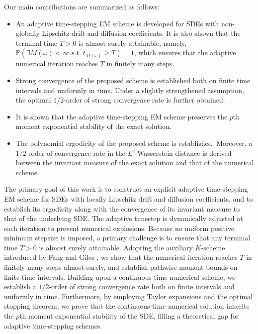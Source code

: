 \documentclass[preprint,12pt,compress]{elsarticle}
\begin{document}
Our main contributions are summarized as follows:
\begin{itemize}
	\item An adaptive time-stepping EM scheme is developed for SDEs with non-globally Lipschitz drift and diffusion coefficients. It is also shown that the terminal time $T>0$ is almost surely attainable, namely,
	$\mathbb{P}(\exists M(\omega ) < \infty \; \text{s.t.} \; {t_{M(\omega )}} \ge T) = 1$,
	which ensures that the adaptive numerical iteration reaches $T$ in finitely many steps.

	\item Strong convergence of the proposed scheme is established both on finite time intervals and uniformly in time. Under a slightly strengthened assumption, the optimal $1/2$-order of strong convergence rate is further obtained.
	
	\item It is shown that the adaptive time-stepping EM scheme preserves the $p$th moment exponential stability of the exact solution.
	
	\item The polynomial ergodicity of the proposed scheme is established. Moreover, a $1/2$-order of convergence rate in the $L^q$-Wasserstein distance is derived between the invariant measure of the exact solution and that of the numerical scheme.

\end{itemize}

The primary goal of this work is to construct an explicit adaptive time-stepping EM scheme for SDEs with locally Lipschitz drift and diffusion coefficients, and to establish its ergodicity along with the convergence of its invariant measure to that of the underlying SDE.
The adaptive timestep is dynamically adjusted at each iteration to prevent numerical explosions.
Because no uniform positive minimum stepsize is imposed, a primary challenge is to ensure that any terminal time $T > 0$ is almost surely attainable. Adopting the auxiliary $K$-scheme introduced by Fang and Giles \cite{fang2020adaptive}, we show that the numerical iteration reaches $T$ in finitely many steps almost surely, and establish pathwise moment bounds on finite time intervals. Building upon a continuous-time numerical scheme, we establish a $1/2$-order of strong convergence rate both on finite intervals and uniformly in time.
Furthermore, by employing Taylor expansions and the optimal stopping theorem, we prove that the continuous-time numerical solution inherits the $p$th moment exponential stability of the SDE, filling a theoretical gap for adaptive time-stepping schemes.
\end{document}
